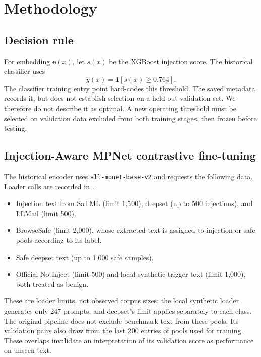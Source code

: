 \documentclass[11pt, a4paper]{article}
\begin{document}
\section{Methodology}
\label{sec:method}

\subsection{Decision rule}
For embedding $\mathbf{e}(x)$, let $s(x)$ be the XGBoost injection score.
The historical classifier uses
\begin{equation}
\hat{y}(x) = \mathbf{1}[s(x) \ge 0.764].
\end{equation}
The classifier training entry point hard-codes this threshold. The saved
metadata records it, but does not establish selection on a held-out
validation set. We therefore do not describe it as optimal. A new
operating threshold must be selected on validation data excluded from both
training stages, then frozen before testing.

\subsection{Injection-Aware MPNet contrastive fine-tuning}

The historical encoder uses \texttt{all-mpnet-base-v2} and requests the
following data. Loader calls are recorded in
.
\begin{itemize}
    \item Injection text from SaTML (limit 1{,}500), deepset (up to 500
          injections), and LLMail (limit 500).
    \item BrowseSafe (limit 2{,}000), whose extracted text is assigned to
          injection or safe pools according to its label.
    \item Safe deepset text (up to 1{,}000 safe samples).
    \item Official NotInject (limit 500) and local synthetic trigger text
          (limit 1{,}000), both treated as benign.
\end{itemize}
These are loader limits, not observed corpus sizes: the local synthetic
loader generates only 247 prompts, and deepset's limit applies separately
to each class. The original pipeline does not exclude benchmark text from
these pools. Its validation pairs also draw from the last 200 entries of
pools used for training. These overlaps invalidate an interpretation of
its validation score as performance on unseen text.
\end{document}
